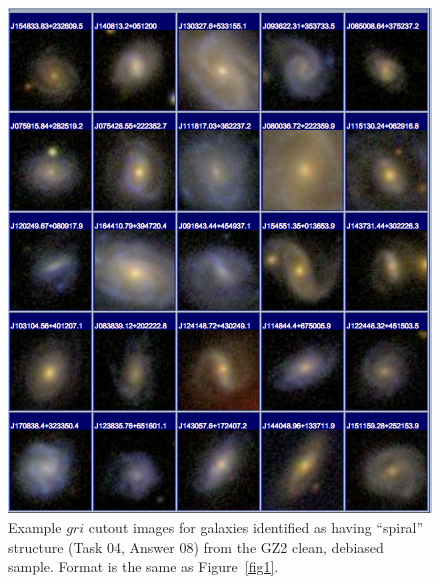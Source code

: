 \documentclass[useAMS,usenatbib]{mn2e}
\begin{document}
\newpage
\clearpage
\begin{figure}
\includegraphics[angle=0,width=7.0in]{figures/gallery/spiral.png}
\caption{Example $gri$ cutout images for galaxies identified as having ``spiral'' structure (Task 04, Answer 08) from the GZ2 clean, debiased sample. Format is the same as Figure~\ref{fig1}.}
\end{figure}
\end{document}
